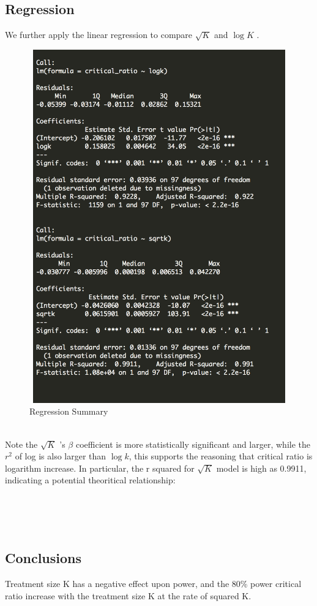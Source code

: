 \documentclass[english]{article}\usepackage{graphicx, color}
\numberwithin{equation}{section}
\numberwithin{figure}{section}
\begin{document}
\subsection{Regression}
We further apply the linear regression to compare $\sqrt{K}$ and $\log{K}$ .
\begin{figure}[htbp]
\centering\includegraphics[width=4.8in, height=6in]{reg}
\caption{Regression Summary}
\end{figure}
\quad\\
Note the $\sqrt{K}$ 's $\beta$ coefficient is more statistically significant and larger, while the $r^2$ of log is also larger than $\log{k}$, this supports the reasoning that critical ratio is logarithm increase. In particular, the r squared for  $\sqrt{K}$ model is high as 0.9911, indicating a potential theoritical relationship: 


\quad\\
\quad\\
\quad\\



\subsection{Conclusions}
Treatment size K has a negative effect upon power, and the 80\% power critical ratio increase with the treatment size K at the rate of squared K.
\end{document}

